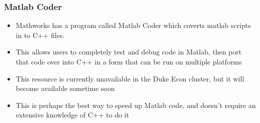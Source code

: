 \documentclass[english,xcolor=dvipsnames]{beamer}
\newcommand{\bi}{\begin{itemize}}
\newcommand{\ei}{\end{itemize}}
\begin{document}
\begin{frame}
\frametitle{Matlab Coder}
   \bi 
   \item Mathworks has a program called Matlab Coder which coverts matlab scripts in to C++ files.
   \item This allows users to completely test and debug code in Matlab, then port that code over into C++ in a form that can be run on multiple platforms
   \item This resource is currently unavailable in the Duke Econ cluster, but it will become available sometime soon
   \item This is perhaps the best way to speed up Matlab code, and doesn't require an extensive knowledge of C++ to do it
   \ei
\end{frame}
\end{document}
